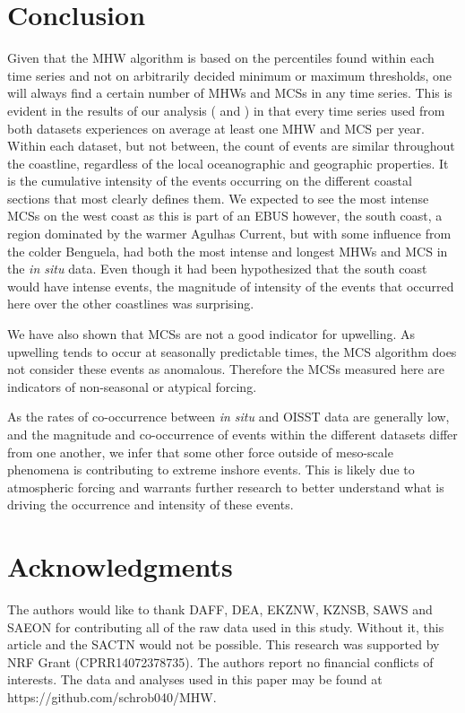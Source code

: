 \documentclass[a4paper,10pt,review]{elsarticle}
\begin{document}
\section{Conclusion}
Given that the MHW algorithm is based on the percentiles found within each time series and not on arbitrarily decided minimum or maximum thresholds, one will always find a certain number of MHWs and MCSs in any time series. This is evident in the results of our analysis ( and ) in that every time series used from both datasets experiences on average at least one MHW and MCS per year. Within each dataset, but not between, the count of events are similar throughout the coastline, regardless of the local oceanographic and geographic properties. It is the cumulative intensity of the events occurring on the different coastal sections that most clearly defines them. We expected to see the most intense MCSs on the west coast as this is part of an EBUS however, the south coast, a region dominated by the warmer Agulhas Current, but with some influence from the colder Benguela, had both the most intense and longest MHWs and MCS in the \emph{in situ} data. Even though it had been hypothesized that the south coast would have intense events, the magnitude of intensity of the events that occurred here over the other coastlines was surprising.

We have also shown that MCSs are not a good indicator for upwelling. As upwelling tends to occur at seasonally predictable times, the MCS algorithm does not consider these events as anomalous. Therefore the MCSs measured here are indicators of non-seasonal or atypical forcing.

As the rates of co-occurrence between \emph{in situ} and OISST data are generally low, and the magnitude and co-occurrence of events within the different datasets differ from one another, we infer that some other force outside of meso-scale phenomena is contributing to extreme inshore events. This is likely due to atmospheric forcing and warrants further research to better understand what is driving the occurrence and intensity of these events.

\section*{Acknowledgments}
The authors would like to thank DAFF, DEA, EKZNW, KZNSB, SAWS and SAEON for contributing all of the raw data used in this study. Without it, this article and the SACTN would not be possible. This research was supported by NRF Grant (CPRR14072378735). The authors report no financial conflicts of interests. The data and analyses used in this paper may be found at https://github.com/schrob040/MHW.
\end{document}
